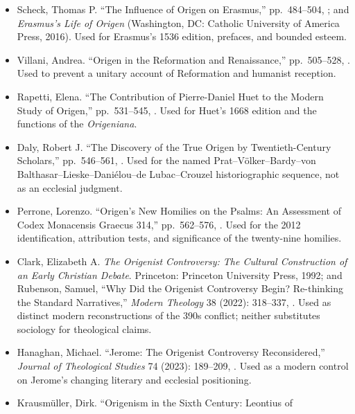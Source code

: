 \begin{itemize}
effect on transmission.
\item Scheck, Thomas P. ``The Influence of Origen on Erasmus,'' pp.~484--504,
;
and \emph{Erasmus's Life of Origen} (Washington, DC: Catholic University of
America Press, 2016). Used for Erasmus's 1536 edition, prefaces, and bounded
esteem.
\item Villani, Andrea. ``Origen in the Reformation and Renaissance,''
pp.~505--528,
.
Used to prevent a unitary account of Reformation and humanist reception.
\item Rapetti, Elena. ``The Contribution of Pierre-Daniel Huet to the Modern
Study of Origen,'' pp.~531--545,
.
Used for Huet's 1668 edition and the functions of the \emph{Origeniana}.
\item Daly, Robert J. ``The Discovery of the True Origen by Twentieth-Century
Scholars,'' pp.~546--561,
.
Used for the named Prat--V\"olker--Bardy--von Balthasar--Lieske--Dani\'elou--de
Lubac--Crouzel historiographic sequence, not as an ecclesial judgment.
\item Perrone, Lorenzo. ``Origen's New Homilies on the Psalms: An Assessment of
Codex Monacensis Graecus 314,'' pp.~562--576,
.
Used for the 2012 identification, attribution tests, and significance of the
twenty-nine homilies.
\item Clark, Elizabeth A. \emph{The Origenist Controversy: The Cultural
Construction of an Early Christian Debate}. Princeton: Princeton University
Press, 1992; and Rubenson, Samuel, ``Why Did the Origenist Controversy Begin?
Re-thinking the Standard Narratives,'' \emph{Modern Theology} 38 (2022):
318--337,
. Used as distinct
modern reconstructions of the 390s conflict; neither substitutes sociology for
theological claims.
\item Hanaghan, Michael. ``Jerome: The Origenist Controversy Reconsidered,''
\emph{Journal of Theological Studies} 74 (2023): 189--209,
. Used as a modern
control on Jerome's changing literary and ecclesial positioning.
\item Krausm\"uller, Dirk. ``Origenism in the Sixth Century: Leontius of

\end{itemize}
